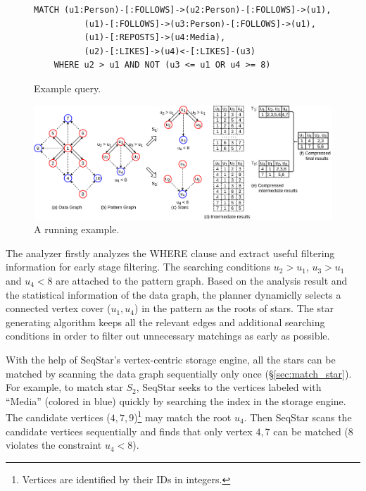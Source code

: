 \begin{figure}[ht]
  \begin{Verbatim}[fontsize=\small]
    MATCH (u1:Person)-[:FOLLOWS]->(u2:Person)-[:FOLLOWS]->(u1),
          (u1)-[:FOLLOWS]->(u3:Person)-[:FOLLOWS]->(u1),
          (u1)-[:REPOSTS]->(u4:Media),
          (u2)-[:LIKES]->(u4)<-[:LIKES]-(u3)
    WHERE u2 > u1 AND NOT (u3 <= u1 OR u4 >= 8)
  \end{Verbatim}
  \caption{Example query.}\label{img:cypher_query}
\end{figure}

\begin{figure}[ht]
  \centering
  \includegraphics[width=\textwidth]{img/running_example.pdf}
  \caption{A running example.}\label{img:running_example}
\end{figure}

The analyzer firstly analyzes the WHERE clause and extract useful filtering information for early stage filtering.
The searching conditions $u_2> u_1$, $u_3 > u_1$ and $u_4 < 8$ are attached to the pattern graph.
Based on the analysis result and the statistical information of the data graph,
the planner dynamiclly selects a connected vertex cover ($u_1, u_4$) in the pattern as the roots of stars.
The star generating algorithm keeps all the relevant edges and additional searching conditions in order to filter out unnecessary matchings as early as possible.

With the help of SeqStar's vertex-centric storage engine,
all the stars can be matched by scanning the data graph sequentially only once (\S\ref{sec:match_star}).
For example, to match star $S_2$,
SeqStar seeks to the vertices labeled with ``Media'' (colored in blue) quickly by searching the index in the storage engine.
The candidate vertices ($4, 7, 9$)\footnote{Vertices are identified by their IDs in integers.} may match the root $u_4$.
Then SeqStar scans the candidate vertices sequentially and finds that only vertex $4, 7$ can be matched ($8$ violates the constraint $u_4 < 8$).

